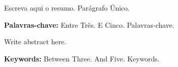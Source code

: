 





\begin{resumo}

Escreva aqui o resumo. Parágrafo Único.

\textbf{Palavras-chave:}  Entre Três. E Cinco. Palavras-chave.

\end{resumo}

\begin{udescabstract}

Write abstract here.

\textbf{Keywords:} Between Three. And Five. Keywords.
\end{udescabstract}